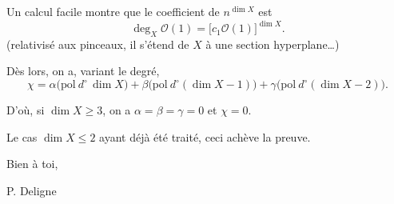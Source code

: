 \documentclass[11pt]{article}
\newcommand{\OO}{\mathcal O}
\begin{document}
Un calcul facile montre que le coefficient de \(n^{\dim X}\) est
\[
\deg_X \OO(1)=\bigl[c_1\OO(1)\bigr]^{\dim X}.
\]
(relativisé aux pinceaux, il s'étend de \(X\) à une section hyperplane\ldots)

Dès lors, on a, variant le degré,
\[
\chi=\alpha\bigl(\mathrm{pol}\ d^\circ\,\dim X\bigr)
+\beta\bigl(\mathrm{pol}\ d^\circ(\dim X-1)\bigr)
+\gamma\bigl(\mathrm{pol}\ d^\circ(\dim X-2)\bigr).
\]

D'où, si \(\dim X\geq 3\), on a \(\alpha=\beta=\gamma=0\) et \(\chi=0\).

Le cas \(\dim X\leq 2\) ayant déjà été traité, ceci achève la preuve.

\vspace{0.8em}

Bien à toi,

\hspace{2em}P. Deligne
\end{document}

